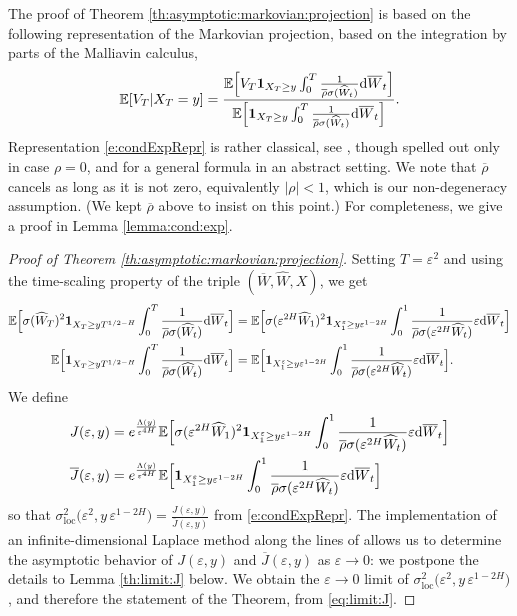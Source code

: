 \documentclass[11pt]{article}
\theoremstyle{plain}
\theoremstyle{definition}
\theoremstyle{remark}
\newcommand{\be}{\beta}
\renewcommand{\bar}{\overline}
\renewcommand{\hat}{\widehat}
\newcommand{\dd}{\mathrm{d}}
\newcommand{\bE}{\mathbb{E}}
\newcommand{\1}{\mathbf{1}}
\numberwithin{equation}{section}
\def\eps{\varepsilon}
\def\be{\begin{equation}}
\def\ee{\end{equation}}
\def\sigDup{\sigma_\mathrm{loc}}
\begin{document}
The proof of Theorem \ref{th:asymptotic:markovian:projection} is based on the following representation of the Markovian projection, 
based on the integration by parts of the Malliavin calculus,
\be \label{e:condExpRepr}
\bE [V_T |X_T = y ]
=
\frac{ 
\bE \Bigl[ V_T %
\1_{X_T \geq y }
\int_0^T\frac{1}{\bar{\rho} \sigma(\hat{W}_t)  } \dd \bar{W}_t  \Bigr]
}{
\bE \Bigl[ \1_{X_T \geq y} \int_0^T\frac{1}{\bar{\rho} \sigma(\hat{W}_t) } \dd \bar{W}_t \Bigr]
}.
\ee
Representation \eqref{e:condExpRepr} is rather classical, see \cite{fournie2001applications}, though spelled out only in case $\rho = 0$, and \cite[Lemma 3]{bally:inria-00071868} for a general formula in an abstract setting. We note that $\bar \rho$ cancels as long as it is not zero, equivalently $|\rho| < 1$, which is our non-degeneracy assumption. (We kept $\bar\rho$ above to insist on this point.) 
For completeness, we give a proof in Lemma \ref{lemma:cond:exp}.


\begin{proof}[Proof of Theorem \ref{th:asymptotic:markovian:projection}]
Setting $T = \eps^2$ and using the
time-scaling property of the triple $(\bar W, \hat W, X)$, we get
\[
\begin{split}
\bE \Bigl[ \sigma(\hat{W}_T)^2 \1_{X_T \geq y T^{1/2-H}} \int_0^T\frac{1}{\bar{\rho} \sigma(\hat{W}_t)  } \dd \bar{W}_t \Bigr]
&=
\bE \Bigl[\sigma(\eps^{2H}\hat{W}_1)^2 \1_{X_1^\eps \geq y \eps^{1-2H}} \int_0^1\frac{1}{\bar{\rho} \sigma(\eps^{2H} \hat{W}_t) } \eps  \dd \bar{W}_t\Bigr]
\\
\bE \Bigl[ \1_{X_T \geq y T^{1/2-H}} \int_0^T\frac{1}{\bar{\rho} \sigma(\hat{W}_t)  } \dd \bar{W}_t \Bigr]
&=
\bE \Bigl[\1_{X_1^\eps \geq y \eps^{1-2H}} \int_0^1\frac{1}{\bar{\rho} \sigma(\eps^{2H} \hat{W}_t) } \eps  \dd \bar{W}_t \Bigr] .
\end{split}
\]
We define
\begin{equation}\label{eq:def:J}
\begin{split}
J(\eps,y) 
&= 
e^{\frac{\Lambda (y)}{\eps^{4H}}} \bE\Bigr[\sigma(\eps^{2H}\hat{W}_1)^2 \1_{X_1^\eps \geq y \eps^{1-2H}} \int_0^1\frac{1}{\bar{\rho} \sigma(\eps^{2H} \hat{W}_t) } \eps  \dd \bar{W}_t\Big] 
\\
\overline{J}(\eps,y) &= e^{\frac{\Lambda (y)}{\eps^{4H}}} \bE \Bigl[ \1_{X_1^\eps \geq y \eps^{1-2H}}  \int_0^1\frac{1}{\bar{\rho} \sigma(\eps^{2H} \hat{W}_t) } \eps  \dd \bar{W}_t\Big] 
\end{split}
\end{equation}
so that $\sigDup^2 \bigl(\eps^2, y \, \eps^{1-2H} \bigr) = \frac{J(\eps, y)}{\overline{J}(\eps,y)}$ from \eqref{e:condExpRepr}.
The implementation of an infinite-dimensional Laplace method  along the lines of \cite{friz2018precise1} allows us to determine the asymptotic behavior of $J(\eps, y)$ and $\overline{J}(\eps,y)$ as $\eps \to 0$: we postpone the details to Lemma \ref{th:limit:J} below. 
We obtain the $\eps \to 0$ limit of $\sigDup^2 \bigl(\eps^2, y \, \eps^{1-2H} \bigr)$, and therefore the statement of the Theorem, from \eqref{eq:limit:J}.
\end{proof}
\end{document}

